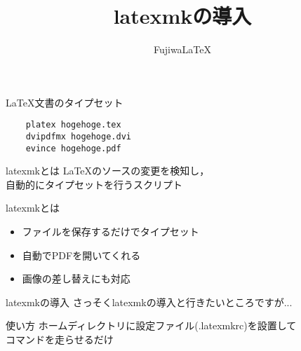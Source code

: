 \documentclass[a4j,uplatex,dvipdfmx]{beamer}
\title{latexmkの導入}
\author{FujiwaLaTeX}
\institute{室蘭工業大学工学研究科 情報電子工学系専攻}
\begin{document}
\maketitle
\begin{frame}[fragile]{\LaTeX 文書のタイプセット}
  \begin{verbatim}
    platex hogehoge.tex
    dvipdfmx hogehoge.dvi
    evince hogehoge.pdf
  \end{verbatim}
\end{frame}
\begin{frame}{latexmkとは}
  \LaTeX のソースの変更を検知し，\\
  自動的にタイプセットを行うスクリプト
\end{frame}
\begin{frame}{latexmkとは}
  \begin{itemize}
    \item ファイルを保存するだけでタイプセット
    \item 自動でPDFを開いてくれる
    \item 画像の差し替えにも対応
  \end{itemize}
\end{frame}
\begin{frame}{latexmkの導入}
  さっそくlatexmkの導入と行きたいところですが...
\end{frame}
\begin{frame}{使い方}
  ホームディレクトリに設定ファイル(.latexmkrc)を設置して\\
  コマンドを走らせるだけ
\end{frame}
\end{document}
